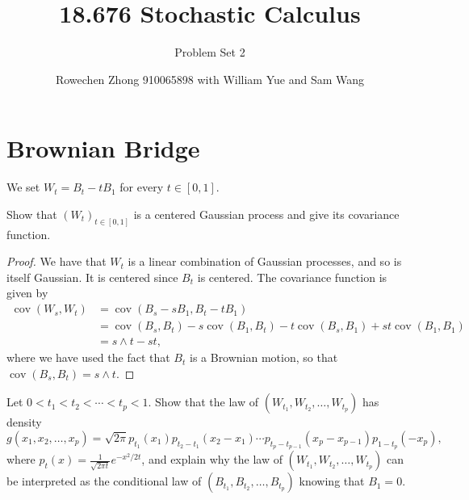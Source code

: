 \documentclass{scrartcl}
\title{18.676 Stochastic Calculus}
\subtitle{Problem Set 2}
\author{Rowechen Zhong 910065898 with William Yue and Sam Wang}
\DeclareMathOperator{\cov}{cov}
\begin{document}
\section{Brownian Bridge}
\begin{prob*}
    We set $W_t = B_t - tB_1$ for every $t \in [0, 1]$. 
\end{prob*}
\begin{prob}
    Show that $(W_t)_{t \in [0, 1]}$ is a centered Gaussian process and give its covariance function.
\end{prob}
\begin{proof}
    We have that $W_t$ is a linear combination of Gaussian processes, and so is itself Gaussian. It is centered since $B_t$ is centered. The covariance function is given by
    \begin{align*}
        \cov(W_s, W_t) &= \cov(B_s - sB_1, B_t - tB_1) \\
        &= \cov(B_s, B_t) - s\cov(B_1, B_t) - t\cov(B_s, B_1) + st\cov(B_1, B_1) \\
        &= s\wedge t - st,
    \end{align*}
    where we have used the fact that $B_t$ is a Brownian motion, so that $\cov(B_s, B_t) = s\wedge t$.
\end{proof}
\begin{prob}
    Let $0 < t_1 < t_2 < \cdots < t_p < 1$. Show that the law of $(W_{t_1}, W_{t_2}, \ldots, W_{t_p})$ has density
    \[
        g(x_1, x_2, \ldots, x_p) = \sqrt{2\pi} p_{t_1}(x_1)p_{t_2 - t_1}(x_2 - x_1)\cdots p_{t_p - t_{p-1}}(x_p - x_{p-1})p_{1 - t_p}(-x_p),
    \]
    where $p_t(x) = \frac{1}{\sqrt{2\pi t}}e^{-x^2/2t}$, and explain why the law of $(W_{t_1}, W_{t_2}, \ldots, W_{t_p})$ can be interpreted as the conditional law of $(B_{t_1}, B_{t_2}, \ldots, B_{t_p})$ knowing that $B_1 = 0$.
\end{prob}
\end{document}
